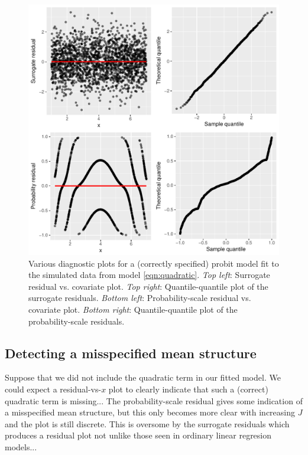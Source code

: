\begin{figure}[!htbp]
  \centering
  \includegraphics[width=1\textwidth]{correct-model}
  \caption{Various diagnostic plots for a (correctly specified) probit model fit to the simulated data from model \eqref{eqn:quadratic}. \textit{Top left}: Surrogate residual vs. covariate plot. \textit{Top right}: Quantile-quantile plot of the surrogate residuals. \textit{Bottom left}: Probability-scale residual vs. covariate plot. \textit{Bottom right}: Quantile-quantile plot of the probability-scale residuals.}
  \label{fig:correct-model}
\end{figure}


\subsection{Detecting a misspecified mean structure}

Suppose that we did not include the quadratic term in our fitted model. We could expect a residual-vs-$x$ plot to clearly indicate that such a (correct) quadratic term is missing...
The probability-scale residual gives some indication of a misspecified mean structure, but this only becomes more clear with increasing $J$ and the plot is still discrete. This is oversome by the surrogate residuals which produces a residual plot not unlike those seen in ordinary linear regresion models...

